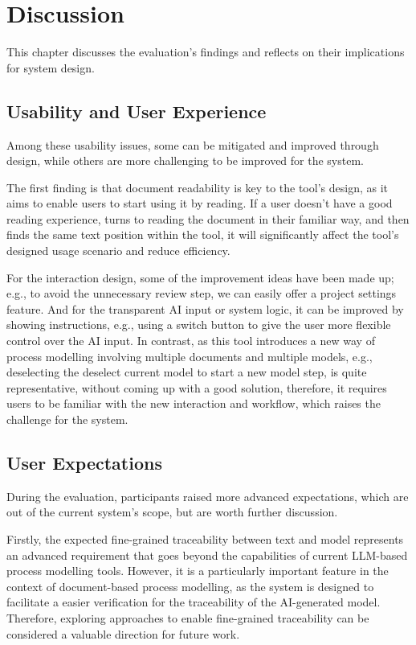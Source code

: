 \chapter{Discussion}
\label{sec:discussion}

This chapter discusses the evaluation's findings and reflects on their implications for system design.

\section{Usability and User Experience}

Among these usability issues, some can be mitigated and improved through design, while others are more challenging to be improved for the system. 

The first finding is that document readability is key to the tool's design, as it aims to enable users to start using it by reading. If a user doesn't have a good reading experience, turns to reading the document in their familiar way, and then finds the same text position within the tool, it will significantly affect the tool's designed usage scenario and reduce efficiency.

For the interaction design, some of the improvement ideas have been made up; e.g., to avoid the unnecessary review step, we can easily offer a project settings feature. And for the transparent AI input or system logic, it can be improved by showing instructions, e.g., using a switch button to give the user more flexible control over the AI input. In contrast, as this tool introduces a new way of process modelling involving multiple documents and multiple models, e.g., deselecting the deselect current model to start a new model step, is quite representative, without coming up with a good solution, therefore, it requires users to be familiar with the new interaction and workflow, which raises the challenge for the system.

\section {User Expectations}
During the evaluation, participants raised more advanced expectations, which are out of the current system's scope, but are worth further discussion.

Firstly, the expected fine-grained traceability between text and model represents an advanced requirement that goes beyond the capabilities of current LLM-based process modelling tools. However, it is a particularly important feature in the context of document-based process modelling, as 
the system is designed to facilitate a easier verification for the traceability of the AI-generated model. Therefore, exploring approaches to enable fine-grained traceability can be considered a valuable direction for future work.

